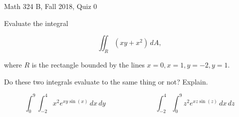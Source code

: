 \documentclass{exam}
\begin{document}
 
\begin{center} \begin{Large} Math 324 B, Fall 2018, Quiz 0\end{Large}
\end{center} 

\vspace{5mm}

\begin{center}
\end{center}

\vspace{1cm}
 

\vspace{1cm}

\begin{questions}
\question Evaluate the integral

\[
\iint_{R} (xy + x^2) \, dA,
\]

where $R$ is the rectangle bounded by the lines $x = 0, x = 1, y = -2, y = 1$. 

\vspace{8cm} 

\question Do these two integrals evaluate to the same thing or not? Explain. 

\[
\int_0^9 \int_{-2}^4 x^2 e^{xy \sin(x)} \, dx \, dy \hspace{3cm}  \int_{-2}^4 \int_{0}^9 z^2 e^{xz \sin(z)} \, dx \, dz
\]
\end{questions}
\end{document}
